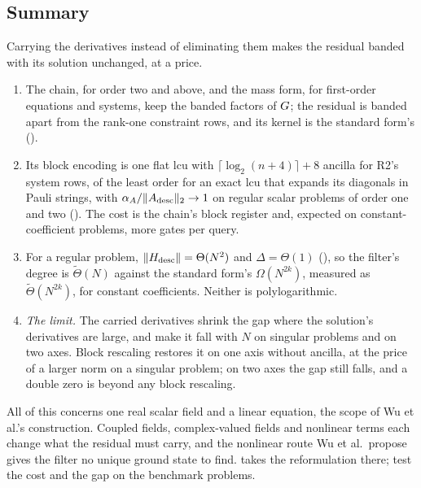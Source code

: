 \subsection{Summary}
\label{sec:descriptor-summary}

Carrying the derivatives instead of eliminating them makes the residual banded with its solution unchanged, at a price.
\begin{enumerate}
    \item The chain, for order two and above, and the mass form, for first-order equations and systems, keep the banded factors of $G$; the residual is banded apart from the rank-one constraint rows, and its kernel is the standard form's ().
    \item Its block encoding is one flat \gls{lcu} with $\lceil\log_2(n+4)\rceil+8$ ancilla for R2's system rows, of the least order for an exact \gls{lcu} that expands its diagonals in Pauli strings, with $\alpha_A/\|A_{\mathrm{desc}}\|_2\to1$ on regular scalar problems of order one and two (). The cost is the chain's block register and, expected on constant-coefficient problems, more gates per query.
    \item For a regular problem, $\|H_{\mathrm{desc}}\|=\Theta(N^2)$ and $\Delta=\Theta(1)$ (), so the filter's degree is $\tilde\Theta(N)$ against the standard form's $\Omega(N^{2k})$, measured as $\tilde\Theta(N^{2k})$, for constant coefficients. Neither is polylogarithmic.
    \item \emph{The limit.} The carried derivatives shrink the gap where the solution's derivatives are large, and make it fall with $N$ on singular problems and on two axes. Block rescaling restores it on one axis without ancilla, at the price of a larger norm on a singular problem; on two axes the gap still falls, and a double zero is beyond any block rescaling.
\end{enumerate}
All of this concerns one real scalar field and a linear equation, the scope of Wu et al.'s construction. Coupled fields, complex-valued fields and nonlinear terms each change what the residual must carry, and the nonlinear route Wu et al.\ propose gives the filter no unique ground state to find.  takes the reformulation there;  test the cost and the gap on the benchmark problems.

